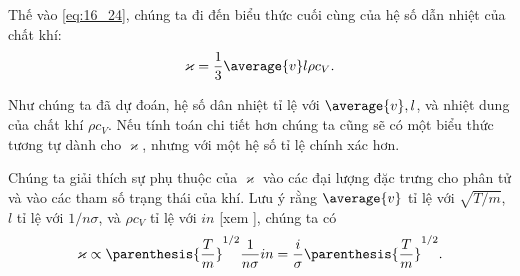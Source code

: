 Thế  vào \eqref{eq:16_24}, chúng ta đi đến biểu thức cuối cùng của hệ số dẫn nhiệt của chất khí: 
\begin{equation}\label{eq:16_26}
    \varkappa = \frac{1}{3} \average{v} l \rho c_V.
\end{equation}

\noindent
Như chúng ta đã dự đoán, hệ số dân nhiệt tỉ lệ với $\average{v}, l$, và nhiệt dung của chất khí $\rho c_V$. Nếu tính toán chi tiết hơn chúng ta cũng sẽ có một biểu thức tương tự dành cho $\varkappa$, nhưng với một hệ số tỉ lệ chính xác hơn.

Chúng ta giải thích sự phụ thuộc của $\varkappa$ vào các đại lượng đặc trưng cho phân tử và vào các tham số trạng thái của khí. Lưu ý rằng $\average{v}$ tỉ lệ với $\sqrt{T/m}$, $l$ tỉ lệ với $1/n\sigma$, và $\rho c_V$ tỉ lệ với $in$ [xem ], chúng ta có
\begin{equation}\label{eq:16_27}
    \varkappa \propto \parenthesis{\frac{T}{m}}^{1/2} \frac{1}{n\sigma} i n = \frac{i}{\sigma} \parenthesis{\frac{T}{m}}^{1/2}.
\end{equation}

